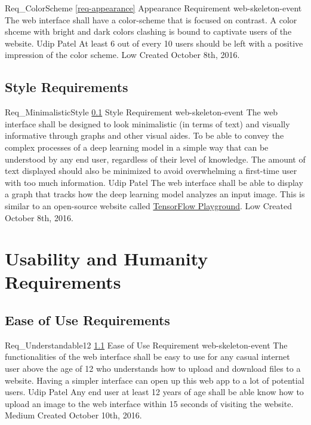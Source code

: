 \documentclass{scrreprt}
\begin{document}
\requirement
{Req_ColorScheme}
{\ref{req-appearance} Appearance Requirement}
{web-skeleton-event} %
{The web interface shall have a color-scheme that is focused on contrast.}
{A color shceme with bright and dark colors clashing is bound to captivate users of the website.}
{Udip Patel}
{At least 6 out of every 10 users should be left with a positive impression of the color scheme.}
{Low}
{Created October 8th, 2016.}

\subsection{Style Requirements}
\label{req-style}

\requirement
{Req_MinimalisticStyle}
{\ref{req-style} Style Requirement}
{web-skeleton-event} %
{The web interface shall be designed to look minimalistic (in terms of text) and visually informative through graphs and other visual aides.}
{To be able to convey the complex processes of a deep learning model in a simple way that can be understood by any end user, regardless of their level of knowledge. The amount of text displayed should also be minimized to avoid overwhelming a first-time user with too much information.}
{Udip Patel}
{The web interface shall be able to display a graph that tracks how the deep learning model analyzes an input image. This is similar to an open-source website called \href{http://playground.tensorflow.org/}{TensorFlow Playground}.}
{Low}
{Created October 8th, 2016.}

\section{Usability and Humanity Requirements}

\subsection{Ease of Use Requirements}
\label{req-ease-of-use}

\requirement
{Req_Understandable12}
{\ref{req-ease-of-use} Ease of Use Requirement}
{web-skeleton-event} %
{The functionalities of the web interface shall be easy to use for any casual internet user above the age of 12 who understands how to upload and download files to a website.}
{Having a simpler interface can open up this web app to a lot of potential users.}
{Udip Patel}
{Any end user at least 12 years of age shall be able know how to upload an image to the web interface within 15 seconds of visiting the website.}
{Medium}
{Created October 10th, 2016.}
\end{document}
